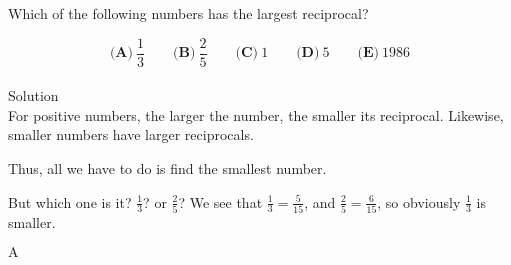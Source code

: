

Which of the following numbers has the largest reciprocal?

\[ \textbf{(A)}\ \frac{1}{3} \qquad
\textbf{(B)}\ \frac{2}{5} \qquad
\textbf{(C)}\ 1 \qquad
\textbf{(D)}\ 5 \qquad
\textbf{(E)}\ 1986
\]
\\
Solution
\\
For positive numbers, the larger the number, the smaller its reciprocal. Likewise, smaller numbers have larger reciprocals.

Thus, all we have to do is find the smallest number.

But which one is it? $\frac{1}{3}$? or $\frac{2}{5}$? We see that $\frac{1}{3} = \frac{5}{15}$, and $\frac{2}{5} = \frac{6}{15}$, so obviously $\frac{1}{3}$ is smaller.

$\boxed{\text{A}}$